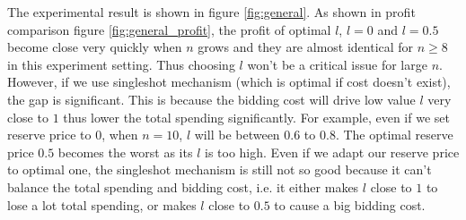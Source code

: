 The experimental result is shown in figure \ref{fig:general}. As shown in
profit comparison figure \ref{fig:general_profit}, the profit of optimal $l$,
$l = 0$ and $l = 0.5$ become close very quickly when $n$ grows and they are
almost identical for $n \geq 8$ in this experiment setting. Thus choosing $l$
won't be a critical issue for large $n$. However, if we use singleshot
mechanism (which is optimal if cost doesn't exist), the gap is significant.
This is because the bidding cost will drive low value $l$ very
close to $1$ thus lower the total spending significantly. For example, even if
we set reserve price to $0$, when $n = 10$, $l$ will be between $0.6$ to $0.8$.
The optimal reserve price $0.5$ becomes the worst as its $l$ is too high. 
Even if we adapt our reserve price to optimal one, the singleshot mechanism is
still not so good because it can't balance the total spending and bidding cost,
i.e. it either makes $l$ close to $1$ to lose a lot total spending, or makes
$l$ close to $0.5$ to cause a big bidding cost.
